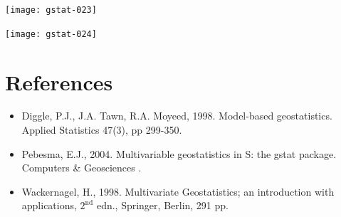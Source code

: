 \documentclass[a4paper]{article}
\begin{document}
\texttt{[image: gstat-023]}

\texttt{[image: gstat-024]}

\section*{References}
\begin{itemize}


\item Diggle, P.J., J.A. Tawn, R.A. Moyeed, 1998. Model-based
geostatistics. Applied Statistics 47(3), pp 299-350.


\item Pebesma, E.J., 2004.  Multivariable geostatistics in S: the gstat
package.  Computers \& Geosciences .


\item Wackernagel, H., 1998. Multivariate Geostatistics; an introduction
with applications, $2^{\mbox{nd}}$ edn., Springer, Berlin, 291 pp.

\end{itemize}
\end{document}
